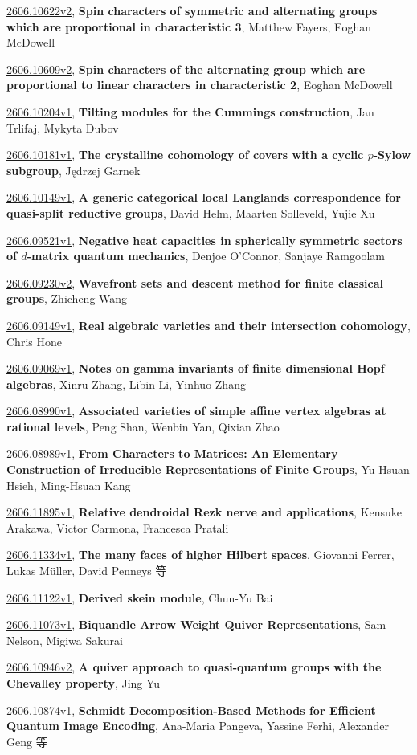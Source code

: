 \documentclass[9pt, a4paper]{article}
\theoremstyle{plain}
\theoremstyle{definition}
\theoremstyle{remark}
\newcommand{\arxiv}[3]{\href{https://arxiv.org/abs/#1}{#1}, \textbf{\textcolor{arxivblue}{#2}}, #3}
\begin{document}
\arxiv{2606.10622v2}{Spin characters of symmetric and alternating groups which are proportional in characteristic 3}{Matthew Fayers, Eoghan McDowell}

\arxiv{2606.10609v2}{Spin characters of the alternating group which are proportional to linear characters in characteristic 2}{Eoghan McDowell}

\arxiv{2606.10204v1}{Tilting modules for the Cummings construction}{Jan Trlifaj, Mykyta Dubov}

\arxiv{2606.10181v1}{The crystalline cohomology of covers with a cyclic $p$-Sylow subgroup}{Jędrzej Garnek}

\arxiv{2606.10149v1}{A generic categorical local Langlands correspondence for quasi-split reductive groups}{David Helm, Maarten Solleveld, Yujie Xu}

\arxiv{2606.09521v1}{Negative heat capacities in spherically symmetric sectors of $d$-matrix quantum mechanics}{Denjoe O'Connor, Sanjaye Ramgoolam}

\arxiv{2606.09230v2}{Wavefront sets and descent method for finite classical groups}{Zhicheng Wang}

\arxiv{2606.09149v1}{Real algebraic varieties and their intersection cohomology}{Chris Hone}

\arxiv{2606.09069v1}{Notes on gamma invariants of finite dimensional Hopf algebras}{Xinru Zhang, Libin Li, Yinhuo Zhang}

\arxiv{2606.08990v1}{Associated varieties of simple affine vertex algebras at rational levels}{Peng Shan, Wenbin Yan, Qixian Zhao}

\arxiv{2606.08989v1}{From Characters to Matrices: An Elementary Construction of Irreducible Representations of Finite Groups}{Yu Hsuan Hsieh, Ming-Hsuan Kang}

\arxiv{2606.11895v1}{Relative dendroidal Rezk nerve and applications}{Kensuke Arakawa, Victor Carmona, Francesca Pratali}

\arxiv{2606.11334v1}{The many faces of higher Hilbert spaces}{Giovanni Ferrer, Lukas Müller, David Penneys 等}

\arxiv{2606.11122v1}{Derived skein module}{Chun-Yu Bai}

\arxiv{2606.11073v1}{Biquandle Arrow Weight Quiver Representations}{Sam Nelson, Migiwa Sakurai}

\arxiv{2606.10946v2}{A quiver approach to quasi-quantum groups with the Chevalley property}{Jing Yu}

\arxiv{2606.10874v1}{Schmidt Decomposition-Based Methods for Efficient Quantum Image Encoding}{Ana-Maria Pangeva, Yassine Ferhi, Alexander Geng 等}
\end{document}
